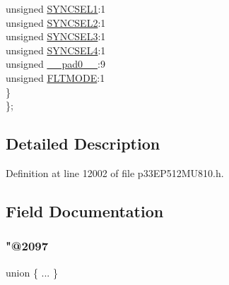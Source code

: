 \begin{DoxyCompactItemize}
\begin{tabbing}
\>\>unsigned \hyperlink{structtag_o_c13_c_o_n2_b_i_t_s_a50e73f95ab1c258ddc64f69c0991deaf}{SYNCSEL1}:1\\
\>\>unsigned \hyperlink{structtag_o_c13_c_o_n2_b_i_t_s_a304907a5d2c4cbf1114a54642a85951e}{SYNCSEL2}:1\\
\>\>unsigned \hyperlink{structtag_o_c13_c_o_n2_b_i_t_s_a6bbd1bd2ead6c9fa713969c6eb0f0c75}{SYNCSEL3}:1\\
\>\>unsigned \hyperlink{structtag_o_c13_c_o_n2_b_i_t_s_a0cd5bbe196c7974953909d27a6307bb7}{SYNCSEL4}:1\\
\>\>unsigned \hyperlink{structtag_o_c13_c_o_n2_b_i_t_s_adf71f3d8410c1f1dbbc96680a92c49af}{\_\_pad0\_\_}:9\\
\>\>unsigned \hyperlink{structtag_o_c13_c_o_n2_b_i_t_s_ad53c2a5303780172219bfd5e0100c782}{FLTMODE}:1\\
\>\} \\
\}; \\

\end{tabbing}\end{DoxyCompactItemize}


\subsection{Detailed Description}


Definition at line 12002 of file p33\+E\+P512\+M\+U810.\+h.



\subsection{Field Documentation}
\mbox{\label{structtag_o_c13_c_o_n2_b_i_t_s_af087ee7c0c54442bac74fd65334638fb}} 
\subsubsection{\texorpdfstring{"@2097}{@2097}}
{\footnotesize\ttfamily union \{ ... \} }

\mbox{\label{structtag_o_c13_c_o_n2_b_i_t_s_adf71f3d8410c1f1dbbc96680a92c49af}} 
